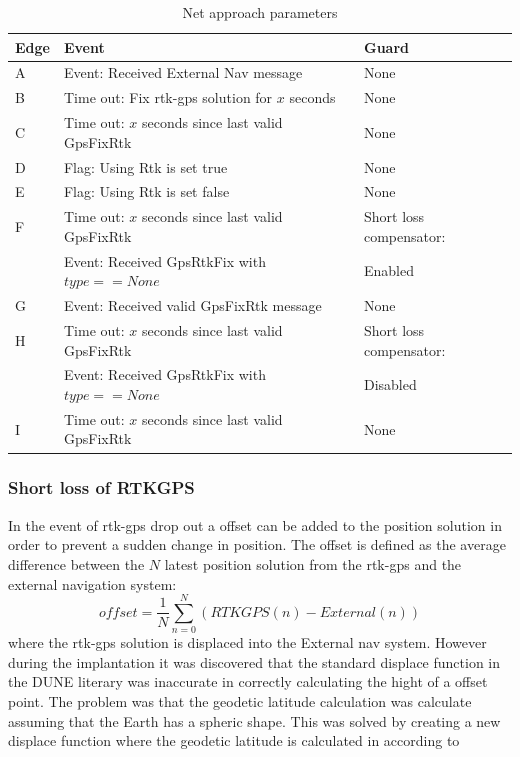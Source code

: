 \begin{figure}\label{Fig:NavState}
\def\svgwidth{\textwidth} %

\end{figure}
\begin{table}[H]

    \begin{tabular}{ | p{1cm} | p{8cm} | | p{4cm} |}
    \hline
    \textbf{Edge} 	& \textbf{Event} 										& \textbf{Guard} \\ \hline
    A 				& Event: Received External Nav message 					& None \\ \hline
    B 				& Time out: Fix \gls{rtk-gps} solution for $x$ seconds 	& None \\ \hline
    C 				& Time out: $x$ seconds since last valid GpsFixRtk 		& None \\ \hline
    D 				& Flag: Using Rtk is set true& None \\ \hline
    E 				& Flag: Using Rtk is set false& None \\ \hline
    F 				& Time out: $x$ seconds since last valid GpsFixRtk 		& Short loss compensator:\\ 
      				& Event: Received GpsRtkFix with $type==None$ 			& Enabled\\ \hline
    G 				& Event: Received valid GpsFixRtk message				& None \\ \hline
    H 				& Time out: $x$ seconds since last valid GpsFixRtk 		& Short loss compensator:\\
    				& Event: Received GpsRtkFix with $type==None$			& Disabled \\ \hline
    I 				& Time out: $x$ seconds since last valid GpsFixRtk 		& None \\ \hline
    \end{tabular}

\caption{Net approach parameters }
\label{Tb:Nav state edge}
\end{table}

\subsubsection{Short loss of RTKGPS}\label{ss:ShortLoss}
In the event of \gls{rtk-gps} drop out a offset can be added to the position solution in order to prevent a sudden change in position. The offset is defined as the average difference between the $N$ latest position solution from the \gls{rtk-gps} and the external navigation system:
\begin{equation}
offset = \frac{1}{N}\sum_{n=0}^N(RTKGPS(n)-External(n))
\end{equation}
where the \gls{rtk-gps} solution is displaced into the External nav system. However during the implantation it was discovered that the standard displace function in the DUNE literary was inaccurate in correctly calculating the hight of a offset point. The problem was that the geodetic latitude calculation was calculate assuming that the Earth has a spheric shape. This was solved by creating a new displace function where the geodetic latitude is calculated in according to

